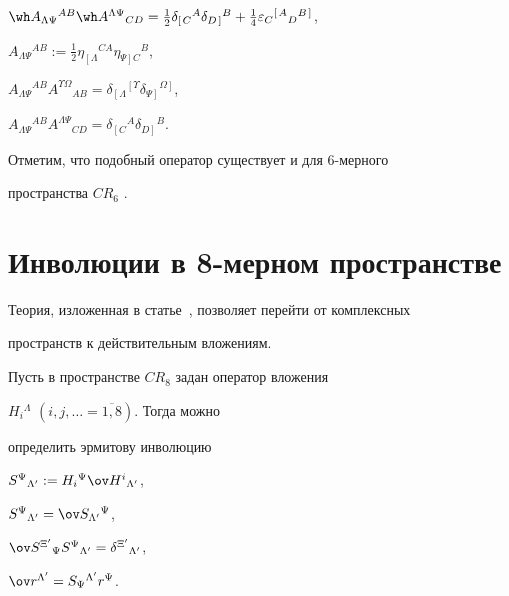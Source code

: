 $\wh A_{\Lambda\Psi}{}^{AB}\wh A^{\Lambda\Psi}{}_{CD}=


\frac{1}{2}\delta_{\left[\right.C}{}^A


\delta_{D\left.\right]}{}^B+


\frac{1}{4}\varepsilon_C{}^{\left[\right.A}{}_D{}^{B\left.\right]}$,


$A_{\Lambda\Psi}{}^{AB}:=\frac{1}{2}\eta_{\left[\right.\Lambda}{}^{CA}


\eta_{\Psi\left.\right]C}{}^B$,


$A_{\Lambda\Psi}{}^{AB} A^{\Upsilon\Omega}{}_{AB}=


\delta_{\left[\right.\Lambda}{}^{\left[\right.\Upsilon}


\delta_{\Psi\left.\right]}{}^{\Omega\left.\right]}$,


$A_{\Lambda\Psi}{}^{AB} A^{\Lambda\Psi}{}_{CD}=


\delta_{\left[\right.C}{}^A\delta_{D\left.\right]}{}^B$.


Отметим, что подобный оператор существует и для 6-мерного


пространства $CR_6$ \cite{Andreev2}.





\section{Инволюции в 8-мерном пространстве}





Теория, изложенная в статье~\cite{Neifeld1}, позволяет перейти от комплексных


пространств к действительным вложениям.


Пусть в пространстве $CR_8$ задан оператор вложения


$H_i{}^\Lambda$ $(i,j,\dotsc=\overline{1,8})$. Тогда можно


определить эрмитову инволюцию




$S^\Psi{}_{\Lambda '}:=H_i{}^\Psi\ov H^i{}_{\Lambda '}$,


$S^\Psi{}_{\Lambda '}=\ov S_{\Lambda '}{}^\Psi$,


$\ov S^{\Xi '}{}_\Psi S^\Psi{}_{\Lambda '}=\delta^{\Xi '}{}_{\Lambda '}$,


$\ov r^{\Lambda '}=S_\Psi{}^{\Lambda '} r^\Psi$.





